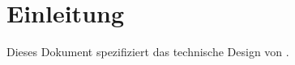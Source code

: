 
\chapter{Einleitung}
\label{sec:Introduction}

Dieses Dokument spezifiziert das technische Design von \LibName{} \LibVersion{}.

%
%
